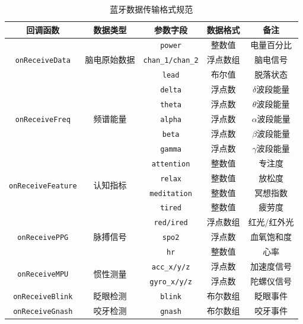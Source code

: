 \begin{table}[h]
\centering
\caption{蓝牙数据传输格式规范}
\label{tab:C6-2}
\begin{tabular}{ccccc}
\toprule
\textbf{回调函数} & \textbf{数据类型} & \textbf{参数字段} & \textbf{数据格式} & \textbf{备注} \\
\midrule
\multirow{3}{*}{\texttt{onReceiveData}} & \multirow{3}{*}{脑电原始数据} & \texttt{power} & 整数值 & 电量百分比 \\
& & \texttt{chan\_1/chan\_2} & 浮点数组 & 脑电信号\\
& & \texttt{lead} & 布尔值 & 脱落状态 \\
\multirow{5}{*}{\texttt{onReceiveFreq}} & \multirow{5}{*}{频谱能量} & \texttt{delta} & 浮点数 & $\delta$波段能量 \\
& & \texttt{theta} & 浮点数 & $\theta$波段能量\\
& & \texttt{alpha} & 浮点数 & $\alpha$波段能量 \\
& & \texttt{beta} & 浮点数 & $\beta$波段能量\\
& & \texttt{gamma} & 浮点数 & $\gamma$波段能量 \\
\multirow{4}{*}{\texttt{onReceiveFeature}} & \multirow{4}{*}{认知指标} & \texttt{attention} & 整数值 & 专注度 \\
& & \texttt{relax} & 整数值 & 放松度 \\
& & \texttt{meditation} & 整数值 & 冥想指数 \\
& & \texttt{tired} & 整数值 & 疲劳度 \\
\multirow{3}{*}{\texttt{onReceivePPG}} & \multirow{3}{*}{脉搏信号} & \texttt{red/ired} & 浮点数组 & 红光/红外光 \\
& & \texttt{spo2} & 浮点数 & 血氧饱和度 \\
& & \texttt{hr} & 整数值 & 心率 \\
\multirow{2}{*}{\texttt{onReceiveMPU}} & \multirow{2}{*}{惯性测量} & \texttt{acc\_x/y/z} & 浮点数 & 加速度信号 \\
& & \texttt{gyro\_x/y/z} & 浮点数 & 陀螺仪信号 \\
\texttt{onReceiveBlink} & 眨眼检测 & \texttt{blink} & 布尔数组 & 眨眼事件 \\
\texttt{onReceiveGnash} & 咬牙检测 & \texttt{gnash} & 布尔数组 & 咬牙事件 \\
\bottomrule
\end{tabular}%
\end{table}

